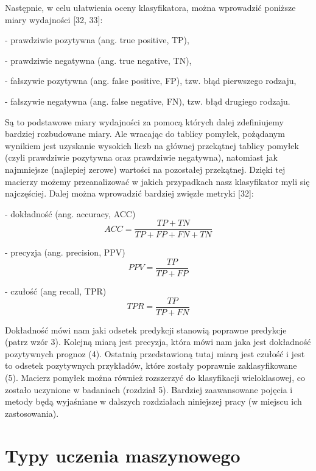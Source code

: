 Następnie, w celu ułatwienia oceny klasyfikatora, można wprowadzić poniższe miary wydajności [32, 33]:

- prawdziwie pozytywna (ang. true positive, TP),

- prawdziwie negatywna (ang. true negative, TN),

- fałszywie pozytywna (ang. false positive, FP), tzw. błąd pierwszego rodzaju,

- fałszywie negatywna (ang. false negative, FN), tzw. błąd drugiego rodzaju.

Są to podstawowe miary wydajności za pomocą których dalej zdefiniujemy bardziej rozbudowane miary. Ale wracając do tablicy pomyłek, pożądanym wynikiem jest uzyskanie wysokich liczb na głównej przekątnej tablicy pomyłek (czyli prawdziwie pozytywna oraz prawdziwie negatywna), natomiast jak najmniejsze (najlepiej zerowe) wartości na pozostałej przekątnej. Dzięki tej macierzy możemy przeanalizować w jakich przypadkach nasz klasyfikator myli się najczęściej. Dalej można wprowadzić bardziej zwięzłe metryki [32]:

- dokładność (ang. accuracy, ACC)
\begin{equation}
ACC=\frac {TP+TN} {TP+FP+FN+TN}
\end{equation}

- precyzja (ang. precision, PPV)
\begin{equation}
PPV=\frac {TP} {TP+FP}
\end{equation}

- czułość (ang recall, TPR)
\begin{equation}
TPR=\frac {TP} {TP+FN}
\end{equation}

Dokładność mówi nam jaki odsetek predykcji stanowią poprawne predykcje (patrz wzór 3). Kolejną miarą jest precyzja, która mówi nam jaka jest dokładność pozytywnych prognoz (4). Ostatnią przedstawioną tutaj miarą jest czułość i jest to odsetek pozytywnych przykładów, które zostały poprawnie zaklasyfikowane (5). Macierz pomyłek można również rozszerzyć do klasyfikacji wieloklasowej, co zostało uczynione w badaniach (rozdział 5). Bardziej zaawansowane pojęcia i metody będą wyjaśniane w dalszych rozdziałach niniejszej pracy (w miejscu ich zastosowania).

\section{Typy uczenia maszynowego}
\label{cha:cha3.2}

